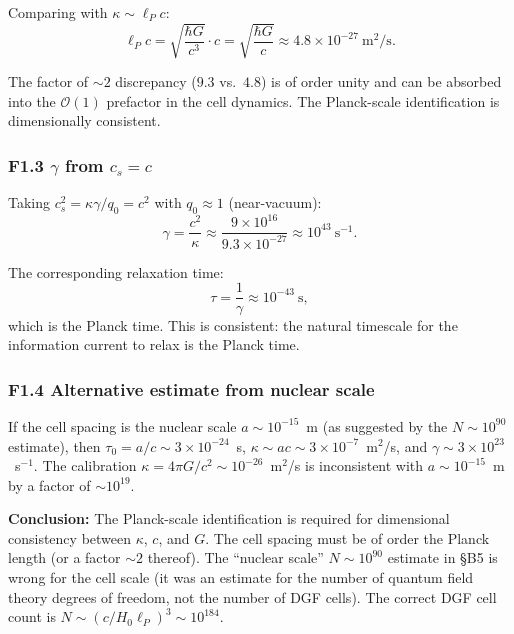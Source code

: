 \documentclass[reprint]{revtex4-2}
\begin{document}
Comparing with $\kappa \sim \ell_P c$:
\begin{equation}
\ell_P c = \sqrt{\frac{\hbar G}{c^3}}\cdot c = \sqrt{\frac{\hbar G}{c}} \approx 4.8\times 10^{-27}~\text{m}^2/\text{s}.
\end{equation}

The factor of $\sim 2$ discrepancy ($9.3$ vs.\ $4.8$) is of order unity and can be absorbed into the $\mathcal{O}(1)$ prefactor in the cell dynamics. The Planck-scale identification is dimensionally consistent.

\subsubsection{F1.3 $\gamma$ from $c_s = c$}

Taking $c_s^2 = \kappa\gamma/q_0 = c^2$ with $q_0\approx 1$ (near-vacuum):
\begin{equation}
\gamma = \frac{c^2}{\kappa} \approx \frac{9\times 10^{16}}{9.3\times 10^{-27}} \approx 10^{43}~\text{s}^{-1}.
\end{equation}

The corresponding relaxation time:
\begin{equation}
\tau = \frac{1}{\gamma} \approx 10^{-43}~\text{s},
\end{equation}
which is the Planck time. This is consistent: the natural timescale for the information current to relax is the Planck time.

\subsubsection{F1.4 Alternative estimate from nuclear scale}

If the cell spacing is the nuclear scale $a \sim 10^{-15}$~m (as suggested by the $N\sim 10^{90}$ estimate), then $\tau_0 = a/c \sim 3\times 10^{-24}$~s, $\kappa \sim a c \sim 3\times 10^{-7}$~m$^2$/s, and $\gamma \sim 3\times 10^{23}$~s$^{-1}$. The calibration $\kappa = 4\pi G/c^2 \sim 10^{-26}$~m$^2$/s is inconsistent with $a \sim 10^{-15}$~m by a factor of $\sim 10^{19}$.

\textbf{Conclusion:} The Planck-scale identification is required for dimensional consistency between $\kappa$, $c$, and $G$. The cell spacing must be of order the Planck length (or a factor $\sim 2$ thereof). The ``nuclear scale'' $N\sim 10^{90}$ estimate in \S B5 is wrong for the cell scale (it was an estimate for the number of quantum field theory degrees of freedom, not the number of DGF cells). The correct DGF cell count is $N \sim (c/H_0\ell_P)^3 \sim 10^{184}$.
\end{document}
